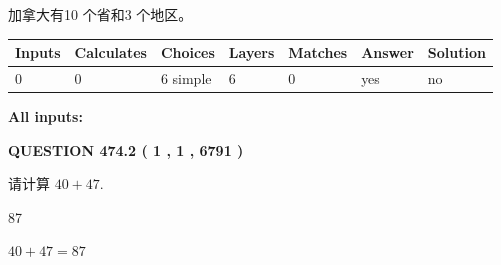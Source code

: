 \documentclass{ctexart}
\begin{document}
 
加拿大有10 个省和3 个地区。
 
 
\noindent{}
 
 
   
   
   
   
\noindent\begin{tabular}{|l|l|l|l|l|l|l|}
 \hline
Inputs & Calculates & Choices & Layers & Matches & Answer & Solution \\ \hline
 0  & 
 0  & 
 6
  simple  
  & 
 6  & 
 0  & 
  yes & 
  no 
  \\ \hline
 \end{tabular}
   
   
   
   
\noindent{}
   
   
   
   
\noindent\vspace{0.1in}\hspace{-0.08in} {\textbf{\Large{All inputs: }}}
   
   
  
\vspace{0.2in}
  
{\textbf{\Large{QUESTION
474.2 
 ( 1 , 1 , 6791 )
}}}
  
  
 
请计算 $ %
40 +  %
47 $.
 
 
 
\noindent{}
 
 

87
 
 
\noindent{}
 
 

 
 
 
\noindent{}
 
 

$ %
40 +  %
47=   %
87$
 
 
\noindent{}
 
 

 
   
   
   
\end{document}
